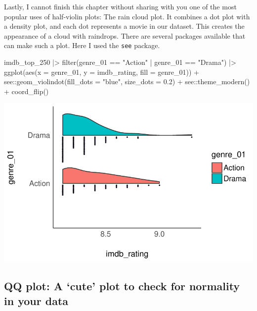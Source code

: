 \documentclass[
  letterpaper,
]{krantz}
\makeatletter
\newenvironment{Shaded}{\begin{snugshade}}{\end{snugshade}}
\newcommand{\AttributeTok}[1]{\textcolor[rgb]{0.40,0.45,0.13}{#1}}
\newcommand{\FloatTok}[1]{\textcolor[rgb]{0.68,0.00,0.00}{#1}}
\newcommand{\FunctionTok}[1]{\textcolor[rgb]{0.28,0.35,0.67}{#1}}
\newcommand{\NormalTok}[1]{\textcolor[rgb]{0.00,0.23,0.31}{#1}}
\newcommand{\SpecialCharTok}[1]{\textcolor[rgb]{0.37,0.37,0.37}{#1}}
\newcommand{\StringTok}[1]{\textcolor[rgb]{0.13,0.47,0.30}{#1}}
\newenvironment{kframe}{%
\medskip{}
\setlength{\fboxsep}{.8em}
 \def\at@end@of@kframe{}%
 \ifinner\ifhmode%
  \def\at@end@of@kframe{\end{minipage}}%
  \begin{minipage}{\columnwidth}%
 \fi\fi%
 \def\FrameCommand##1{\hskip\@totalleftmargin \hskip-\fboxsep
 \colorbox{shadecolor}{##1}\hskip-\fboxsep
     \hskip-\linewidth \hskip-\@totalleftmargin \hskip\columnwidth}%
 \MakeFramed {\advance\hsize-\width
   \@totalleftmargin\z@ \linewidth\hsize
   \@setminipage}}%
 {\par\unskip\endMakeFramed%
 \at@end@of@kframe}
\renewenvironment{Shaded}{\begin{kframe}}{\end{kframe}}
\makeatother
\begin{document}
Lastly, I cannot finish this chapter without sharing with you one of the
most popular uses of half-violin plots: The rain cloud plot. It combines
a dot plot with a density plot, and each dot represents a movie in our
dataset. This creates the appearance of a cloud with raindrops. There
are several packages available that can make such a plot. Here I used
the \texttt{see} package.

\begin{Shaded}
\begin{Highlighting}[]
\NormalTok{imdb\_top\_250 }\SpecialCharTok{|\textgreater{}}
  \FunctionTok{filter}\NormalTok{(genre\_01 }\SpecialCharTok{==} \StringTok{"Action"} \SpecialCharTok{|}\NormalTok{ genre\_01 }\SpecialCharTok{==} \StringTok{"Drama"}\NormalTok{) }\SpecialCharTok{|\textgreater{}}
  \FunctionTok{ggplot}\NormalTok{(}\FunctionTok{aes}\NormalTok{(}\AttributeTok{x =}\NormalTok{ genre\_01, }\AttributeTok{y =}\NormalTok{ imdb\_rating, }\AttributeTok{fill =}\NormalTok{ genre\_01)) }\SpecialCharTok{+}
\NormalTok{  see}\SpecialCharTok{::}\FunctionTok{geom\_violindot}\NormalTok{(}\AttributeTok{fill\_dots =} \StringTok{"blue"}\NormalTok{, }\AttributeTok{size\_dots =} \FloatTok{0.2}\NormalTok{) }\SpecialCharTok{+}
\NormalTok{  see}\SpecialCharTok{::}\FunctionTok{theme\_modern}\NormalTok{() }\SpecialCharTok{+}
  \FunctionTok{coord\_flip}\NormalTok{()}
\end{Highlighting}
\end{Shaded}

\includegraphics{08_descriptive_statistics_files/figure-pdf/rain-cloud-plot-1.pdf}

\subsection{QQ plot: A `cute' plot to check for normality in your
data}\label{sec-qq-plot}
\end{document}
